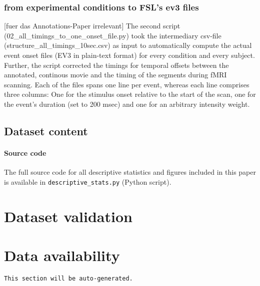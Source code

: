 \documentclass[10pt,a4paper,twocolumn]{article}
\begin{document}
\subsubsection*{from experimental conditions to FSL's ev3 files }
{[fuer das Annotations-Paper irrelevant]} The second script (02\_all\_timings\_to\_one\_onset\_file.py) took the intermediary csv-file (structure\_all\_timings\_10sec.csv)
as input to automatically compute the actual event onset files (EV3
in plain-text format) for every condition and every subject. Further,
the script corrected the timings for temporal offsets between the
annotated, continous movie and the timing of the segments during fMRI
scanning. Each of the files spans one line per event, whereas each
line comprises three columns: One for the stimulus onset relative
to the start of the scan, one for the event's duration (set to 200
msec) and one for an arbitrary intensity weight.

\subsection*{Dataset content}


\paragraph{Source code}

The full source code for all descriptive statistics and figures included in
this paper is available in \texttt{descriptive\_stats.py} (Python script).


\section*{Dataset validation}


\section*{Data availability}

\texttt{This section will be auto-generated.}
\end{document}
